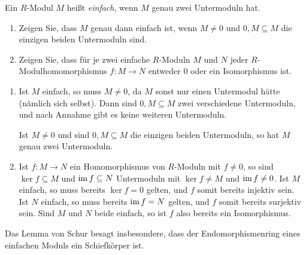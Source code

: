 \begin{question}[subtitle = Schurs Lemma]
  Ein $R$-Modul $M$ heißt \emph{einfach}, wenn $M$ genau zwei Untermoduln hat.
  \begin{enumerate}
    \item
      Zeigen Sie, dass $M$ genau dann einfach ist, wenn $M \neq 0$ und $0, M \subseteq M$ die einzigen beiden Untermoduln sind.
    \item
      Zeigen Sie, dass für je zwei einfache $R$-Moduln $M$ und $N$ jeder $R$-Mo\-dul\-ho\-mo\-mor\-phis\-mus $f \colon M \to N$ entweder $0$ oder ein Isomorphismus ist.
  \end{enumerate}
\end{question}


\begin{solution}
  \begin{enumerate}
    \item
      Ist $M$ einfach, so muss $M \neq 0$, da $M$ sonst nur einen Untermodul hätte (nämlich sich selbst).
      Dann sind $0, M \subseteq M$ zwei verschiedene Untermoduln, und nach Annahme gibt es keine weiteren Untermoduln.
      
      Ist $M \neq 0$ und sind $0, M \subseteq M$ die einzigen beiden Untermoduln, so hat $M$ genau zwei Untermoduln.
    \item
      Ist $f \colon M \to N$ ein Homomorphismus von $R$-Moduln mit $f \neq 0$, so sind $\ker f \subseteq M$ und $\operatorname{im} f \subseteq N$ Untermoduln mit $\ker f \neq M$ und $\operatorname{im} f \neq 0$.
      Ist $M$ einfach, so muss bereits $\ker f = 0$ gelten, und $f$ somit bereits injektiv sein.
      Ist $N$ einfach, so muss bereits $\operatorname{im} f = N$ gelten, und $f$ somit bereits surjektiv sein.
      Sind $M$ und $N$ beide einfach, so ist $f$ also bereits ein Isomorphismus.
  \end{enumerate}
\end{solution}


\begin{remark*}
  Das Lemma von Schur besagt insbesondere, dass der Endomorphismenring eines einfachen Moduls ein Schiefkörper ist.
\end{remark*}


%       



